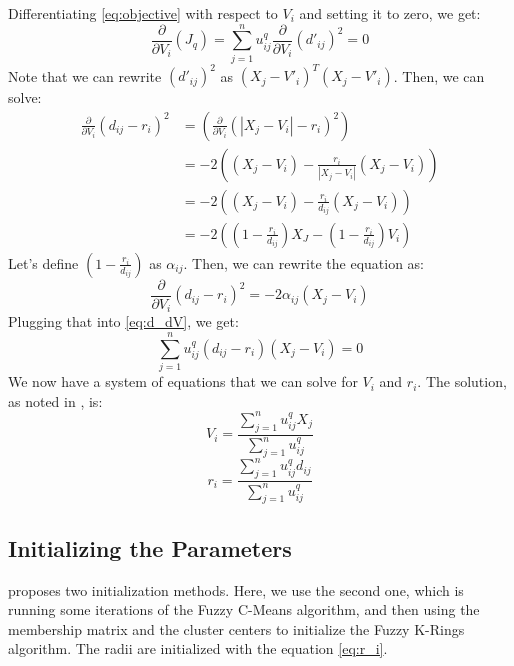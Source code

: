 \documentclass[conference]{IEEEtran}
\begin{document}
Differentiating \eqref{eq:objective} with respect to $V_i$ and setting it to zero, we get:
\begin{equation}\label{eq:d_dV}
\frac{\partial}{\partial V_i}(J_q) = \sum_{j=1}^{n} u_{ij}^q\frac{\partial}{\partial V_i} (d'_{ij})^2 = 0
\end{equation}
Note that we can rewrite $(d'_{ij})^2$ as $(X_j - V'_i)^T(X_j - V'_i)$.
Then, we can solve:
\begin{equation}
\begin{aligned}
\frac{\partial}{\partial V_i} (d_{ij} - r_i)^2 &= \left(\frac{\partial}{\partial V_i} (|X_j - V_i| - r_i)^2\right) \\
&= -2 \left( (X_j - V_i) - \frac{r_i}{|X_j - V_i|} (X_j - V_i) \right) \\
&= -2 \left( (X_j - V_i) - \frac{r_i}{d_{ij}} (X_j - V_i) \right) \\
&= -2 \left( (1 - \frac{r_i}{d_{ij}})X_J - (1 - \frac{r_i}{d_{ij}})V_i \right)
\end{aligned}
\end{equation}
Let's define $(1 - \frac{r_i}{d_{ij}})$ as $\alpha_{ij}$.
Then, we can rewrite the equation as:
\begin{equation}
\frac{\partial}{\partial V_i} (d_{ij} - r_i)^2 = -2 \alpha_{ij} (X_j - V_i)
\end{equation}
Plugging that into \eqref{eq:d_dV}, we get:
\begin{equation}
\sum_{j=1}^{n} u_{ij}^q (d_{ij} - r_i) (X_j - V_i) = 0
\end{equation}
We now have a system of equations that we can solve for $V_i$ and $r_i$.
The solution, as noted in \cite{DAVE1992713}, is:
\begin{equation}
V_i = \frac{\sum_{j=1}^{n} u_{ij}^q X_j}{\sum_{j=1}^{n} u_{ij}^q}
\end{equation}
\begin{equation}\label{eq:r_i}
r_i = \frac{\sum_{j=1}^{n} u_{ij}^q d_{ij}}{\sum_{j=1}^{n} u_{ij}^q}
\end{equation}




\subsection{Initializing the Parameters}
\cite{308484} proposes two initialization methods. Here, we use the second one, which is running some iterations of
the Fuzzy C-Means algorithm, and then using the membership matrix and the cluster centers to initialize the Fuzzy K-Rings algorithm.
The radii are initialized with the equation \eqref{eq:r_i}.
\end{document}
